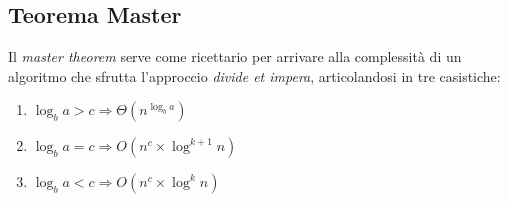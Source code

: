 \subsection{Teorema Master}
Il \textit{master theorem} serve come ricettario per arrivare alla complessità di un algoritmo che sfrutta l'approccio \textit{divide et impera}, articolandosi in tre casistiche:
\begin{enumerate}
	\item $\log_{b}{a} > c \Rightarrow \Theta(n^{\log_{b}{a}})$
	\item $\log_{b}{a} = c \Rightarrow O(n^c\times \log^{k+1}{n})$
	\item $\log_{b}{a} < c \Rightarrow O(n^c\times \log^k{n})$
\end{enumerate}